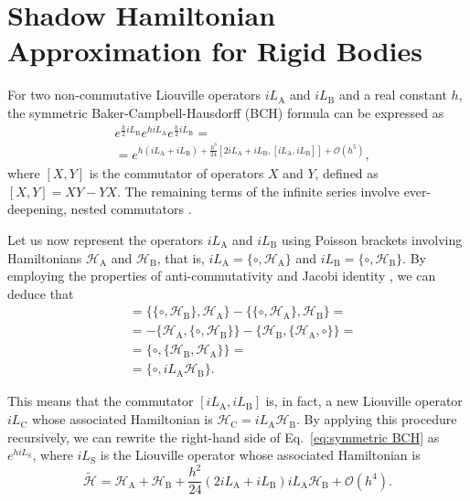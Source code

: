 \documentclass[
journal=jctcce,
layout=twocolumn
]{achemso}
\newcommand{\Ham}[1]{{\mathcal H}_\text{#1}}    %
\newcommand{\Liu}[1]{i\!L_\text{#1}}            %
\newcommand{\timestep}{h}
\newcommand{\refined}[1]{\widetilde{#1}}
\begin{document}
\appendix
{}

\section{Shadow Hamiltonian Approximation for Rigid Bodies}
\label{sec:rigid body shadow hamiltonian}

For two non-commutative Liouville operators $\Liu A$ and $\Liu B$ and a real constant $\timestep$, the symmetric Baker-Campbell-Hausdorff (BCH) formula can be expressed as \cite{Hairer_2006}
\begin{equation}
\label{eq:symmetric BCH}
\begin{split}
&e^{\frac{\timestep}{2} \Liu B} e^{\timestep \Liu A} e^{\frac{\timestep}{2} \Liu B} = \\
&= e^{\timestep (\Liu A + \Liu B) + \frac{\timestep^3}{24} \left[2 \Liu A + \Liu B,[\Liu A,\Liu B]\right] + \mathcal{O}(\timestep^5)},
\end{split}
\end{equation}
where $[X,Y]$ is the commutator of operators $X$ and $Y$, defined as $[X,Y] = XY - YX$.
The remaining terms of the infinite series involve ever-deepening, nested commutators \cite{Hairer_2006}.

Let us now represent the operators $\Liu A$ and $\Liu B$ using Poisson brackets involving Hamiltonians $\Ham A$ and $\Ham B$, that is, $\Liu A = \{\circ,\Ham A\}$ and $\Liu B = \{\circ,\Ham B\}$.
By employing the properties of anti-commutativity and Jacobi identity \cite{Hairer_2006}, we can deduce that
\begin{align*}
[\Liu A,\Liu B] &= \{\{\circ,\Ham B\},\Ham A\} - \{\{\circ,\Ham A\},\Ham B\} = \\
&= -\{\Ham A,\{\circ,\Ham B\}\} - \{\Ham B,\{\Ham A,\circ\}\} = \\
&= \{\circ,\{\Ham B,\Ham A\}\} = \\
&= \{\circ,{\Liu A} {\Ham B}\}.
\end{align*}

This means that the commutator $[\Liu A,\Liu B]$ is, in fact, a new Liouville operator $\Liu C$ whose associated Hamiltonian is $\Ham C = {\Liu A}{\Ham B}$.
By applying this procedure recursively, we can rewrite the right-hand side of Eq.~\eqref{eq:symmetric BCH} as $e^{\timestep \Liu S}$, where $\Liu S$ is the Liouville operator whose associated Hamiltonian is
\begin{equation*}
\label{eq:general shadow hamiltonian}
\refined{\Ham{}} = \Ham A + \Ham B + \frac{h^2}{24} (2 \Liu A + \Liu B){\Liu A}{\Ham B} + \mathcal{O}(h^4).
\end{equation*}
\end{document}
